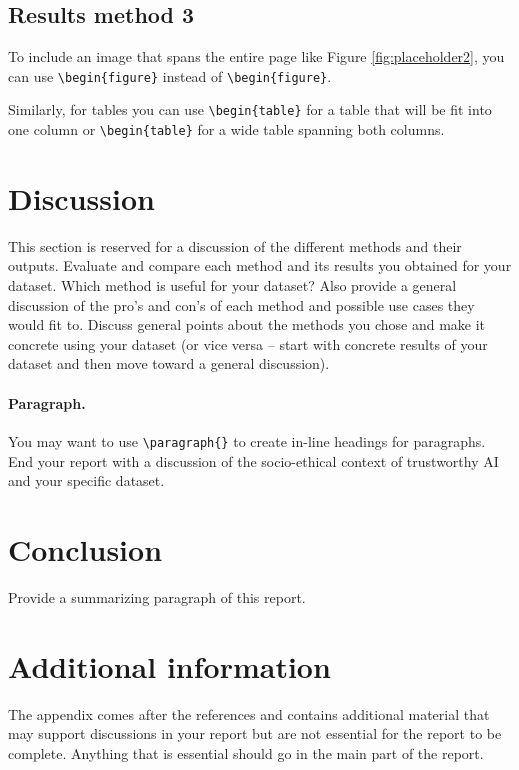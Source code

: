 \documentclass[twocolumn]{article}
\begin{document}
\subsection{Results method 3}

To include an image that spans the entire page like Figure \ref{fig:placeholder2}, you can use \verb|\begin{figure}| instead of \verb|\begin{figure}|.

Similarly, for tables you can use \verb|\begin{table}| for a table that will be fit into one column or \verb|\begin{table}| for a wide table spanning both columns.



\section{Discussion}\label{sec:discussion}

This section is reserved for a discussion of the different methods and their outputs. Evaluate and compare each method and its results you obtained for your dataset. Which method is useful for your dataset? Also provide a general discussion of the pro's and con's of each method and possible use cases they would fit to. Discuss general points about the methods you chose and make it concrete using your dataset (or vice versa -- start with concrete results of your dataset and then move toward a general discussion).

\paragraph{Paragraph.} You may want to use \verb|\paragraph{}| to create in-line headings for paragraphs. \\

\noindent
End your report with a discussion of the socio-ethical context of trustworthy AI and your specific dataset. 

\section{Conclusion}

Provide a summarizing paragraph of this report.


% 



\appendix

\section{Additional information}

The appendix comes after the references and contains additional material that may support discussions in your report but are not essential for the report to be complete. Anything that is essential should go in the main part of the report.
\end{document}
